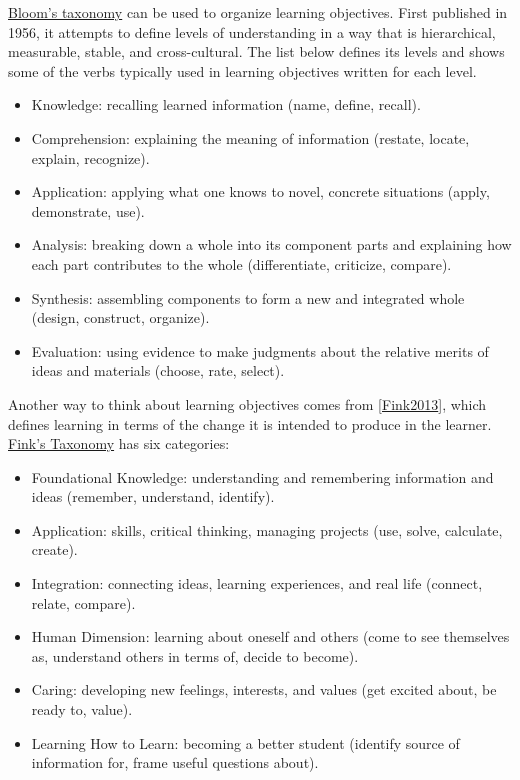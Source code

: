\documentclass[10pt,statementpaper]{memoir}
\providecommand{\tightlist}{%
  \setlength{\itemsep}{0pt}\setlength{\parskip}{0pt}}
\begin{document}
\href{gloss.html\#blooms-taxonomy}{Bloom's taxonomy} can be used to
organize learning objectives. First published in 1956, it attempts to
define levels of understanding in a way that is hierarchical,
measurable, stable, and cross-cultural. The list below defines its
levels and shows some of the verbs typically used in learning objectives
written for each level.

\begin{itemize}
\item
  Knowledge: recalling learned information (name, define, recall).
\item
  Comprehension: explaining the meaning of information (restate, locate,
  explain, recognize).
\item
  Application: applying what one knows to novel, concrete situations
  (apply, demonstrate, use).
\item
  Analysis: breaking down a whole into its component parts and
  explaining how each part contributes to the whole (differentiate,
  criticize, compare).
\item
  Synthesis: assembling components to form a new and integrated whole
  (design, construct, organize).
\item
  Evaluation: using evidence to make judgments about the relative merits
  of ideas and materials (choose, rate, select).
\end{itemize}

Another way to think about learning objectives comes from
{[}\href{biblio.html\#fink-significant}{Fink2013}{]}, which defines
learning in terms of the change it is intended to produce in the
learner. \href{gloss.html\#finks-taxonomy}{Fink's Taxonomy} has six
categories:

\begin{itemize}
\tightlist
\item
  Foundational Knowledge: understanding and remembering information and
  ideas (remember, understand, identify).
\item
  Application: skills, critical thinking, managing projects (use, solve,
  calculate, create).
\item
  Integration: connecting ideas, learning experiences, and real life
  (connect, relate, compare).
\item
  Human Dimension: learning about oneself and others (come to see
  themselves as, understand others in terms of, decide to become).
\item
  Caring: developing new feelings, interests, and values (get excited
  about, be ready to, value).
\item
  Learning How to Learn: becoming a better student (identify source of
  information for, frame useful questions about).
\end{itemize}
\end{document}
